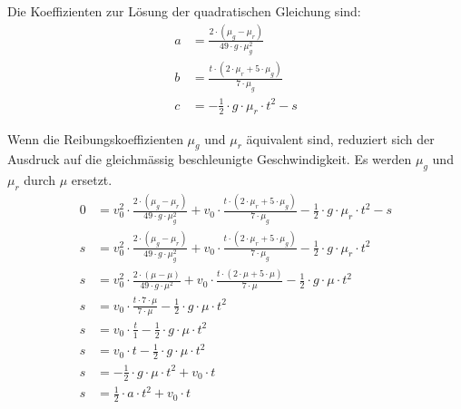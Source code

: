 Die Koeffizienten zur Lösung der quadratischen Gleichung sind:
\begin{align}
    a &= \frac{2 \cdot (\mu_g - \mu_r)}{49 \cdot g \cdot \mu_g^2}\\
    b &= \frac{t \cdot (2 \cdot \mu_r + 5 \cdot \mu_g)}{7 \cdot \mu_g}\\
    c &= - \frac{1}{2} \cdot g \cdot \mu_r \cdot t^2 - s
\end{align}

Wenn die Reibungskoeffizienten $\mu_g$ und $\mu_r$ äquivalent sind, reduziert sich der Ausdruck auf die gleichmässig beschleunigte
Geschwindigkeit. Es werden $\mu_g$ und $\mu_r$ durch $\mu$ ersetzt.
\begin{align}
    0 &= v_0^2 \cdot \frac{2 \cdot (\mu_g - \mu_r)}{49 \cdot g \cdot \mu_g^2} + v_0 \cdot \frac{t \cdot (2 \cdot \mu_r + 5 \cdot \mu_g)}{7 \cdot \mu_g} - \frac{1}{2} \cdot g \cdot \mu_r \cdot t^2 - s\\
    s &= v_0^2 \cdot \frac{2 \cdot (\mu_g - \mu_r)}{49 \cdot g \cdot \mu_g^2} + v_0 \cdot \frac{t \cdot (2 \cdot \mu_r + 5 \cdot \mu_g)}{7 \cdot \mu_g} - \frac{1}{2} \cdot g \cdot \mu_r \cdot t^2\\
    s &= v_0^2 \cdot \frac{2 \cdot (\mu - \mu)}{49 \cdot g \cdot \mu^2} + v_0 \cdot \frac{t \cdot (2 \cdot \mu + 5 \cdot \mu)}{7 \cdot \mu} - \frac{1}{2} \cdot g \cdot \mu \cdot t^2\\
    s &= v_0 \cdot \frac{t \cdot 7 \cdot \mu}{7 \cdot \mu} - \frac{1}{2} \cdot g \cdot \mu \cdot t^2\\
    s &= v_0 \cdot \frac{t}{1} - \frac{1}{2} \cdot g \cdot \mu \cdot t^2\\
    s &= v_0 \cdot t - \frac{1}{2} \cdot g \cdot \mu \cdot t^2\\
    s &= - \frac{1}{2} \cdot g \cdot \mu \cdot t^2 + v_0 \cdot t\\
    s &= \frac{1}{2} \cdot a \cdot t^2 + v_0 \cdot t
\end{align}